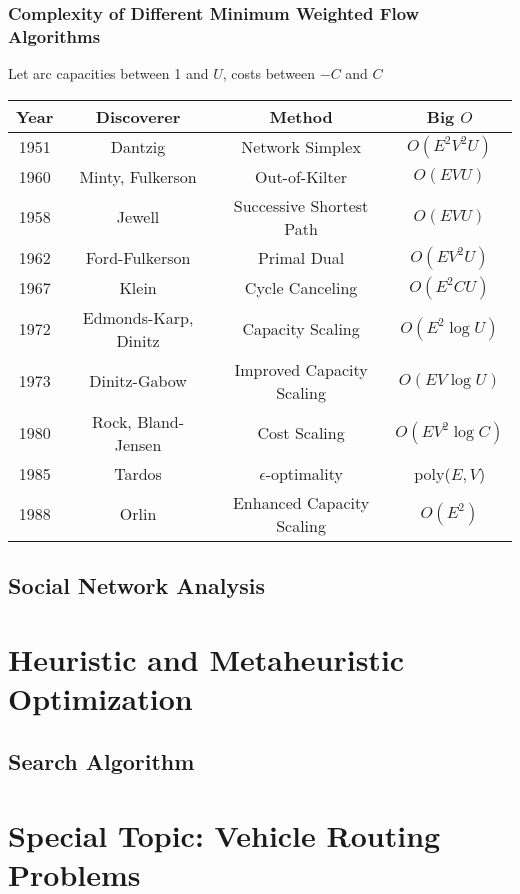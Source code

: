 			\section{Complexity of Different Minimum Weighted Flow Algorithms}
				Let arc capacities between 1 and $U$, costs between $-C$ and $C$
				\begin{table*}[ht]
					\centering
					\begin{tabular} {|c|c|c|c|}
						\hline
						Year & Discoverer & Method & Big $O$ \\
						\hline
						1951 & Dantzig & Network Simplex & $O(E^2V^2U)$ \\
						1960 & Minty, Fulkerson & Out-of-Kilter & $O(EVU)$\\
						1958 & Jewell & Successive Shortest Path & $O(EVU)$ \\
						1962 & Ford-Fulkerson & Primal Dual & $O(EV^2U)$ \\
						1967 & Klein & Cycle Canceling & $O(E^2CU)$ \\
						1972 & Edmonds-Karp, Dinitz & Capacity Scaling & $O(E^2 \log U)$\\
						1973 & Dinitz-Gabow & Improved Capacity Scaling & $O(EV\log U)$ \\
						1980 & Rock, Bland-Jensen & Cost Scaling & $O(EV^2\log C)$\\
						1985 & Tardos & $\epsilon$-optimality & poly($E,V$)\\
						1988 & Orlin & Enhanced Capacity Scaling & $O(E^2)$ \\
						\hline
					\end{tabular}
				\end{table*}

		\chapter{Social Network Analysis}

	\part{Heuristic and Metaheuristic Optimization}\label{Heur}
		\chapter{Search Algorithm}

	\part*{Special Topic: Vehicle Routing Problems}\label{VRP}
